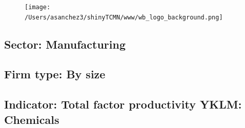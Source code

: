 \documentclass{article}\usepackage[]{graphicx}\usepackage[]{color}
\begin{document}
%

\begin{figure}
  \vspace{-3ex} %
  \hspace{-7ex} %
  \texttt{[image: /Users/asanchez3/shinyTCMN/www/wb\_logo\_background.png]}
\end{figure}
 \begin{minipage}[t]{1.1\textwidth} %
      \vspace{-30ex}
      \hspace{10ex}
  \end{minipage}
  
%
\begin{minipage}[t]{0.99\textwidth} %
  \vspace{-0.5cm}
      \subsection*{\color{white!40!black}Sector: \color{blue!40!black}Manufacturing}
      \subsection*{\color{white!40!black}Firm type: \color{blue!40!black}By size}
      \subsection*{\color{white!40!black}Indicator: \color{blue!40!black}Total factor productivity YKLM: Chemicals}
  \end{minipage} %
\end{document}
